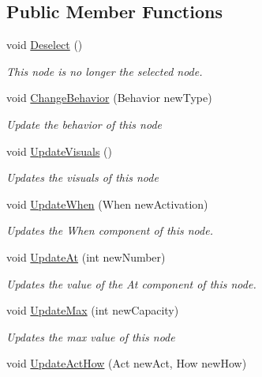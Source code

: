 \subsection*{Public Member Functions}
\begin{DoxyCompactItemize}
\item 
void \hyperlink{class_select_node_button_ac0062be5316502f6835aaa2334408bf0}{Deselect} ()
\begin{DoxyCompactList}\small\item\em This node is no longer the selected node. \end{DoxyCompactList}\item 
void \hyperlink{class_select_node_button_a23cb12320f235b9caf63e15c27c100ed}{Change\+Behavior} (Behavior new\+Type)
\begin{DoxyCompactList}\small\item\em Update the behavior of this node \end{DoxyCompactList}\item 
void \hyperlink{class_select_node_button_a0b21ceeb215b5732c7331efa2fb2f434}{Update\+Visuals} ()
\begin{DoxyCompactList}\small\item\em Updates the visuals of this node \end{DoxyCompactList}\item 
void \hyperlink{class_select_node_button_a5c76435d61c0b3bfdc9e6b9ba64f8bc2}{Update\+When} (When new\+Activation)
\begin{DoxyCompactList}\small\item\em Updates the When component of this node. \end{DoxyCompactList}\item 
void \hyperlink{class_select_node_button_af473e0efc29077bd547d6aa39ed5afc0}{Update\+At} (int new\+Number)
\begin{DoxyCompactList}\small\item\em Updates the value of the At component of this node. \end{DoxyCompactList}\item 
void \hyperlink{class_select_node_button_aff33f2066242975f61556b60e2ebcbb1}{Update\+Max} (int new\+Capacity)
\begin{DoxyCompactList}\small\item\em Updates the max value of this node \end{DoxyCompactList}\item 
void \hyperlink{class_select_node_button_a818b654206abd20d9cd47ddb2dd0beaf}{Update\+Act\+How} (Act new\+Act, How new\+How)

\end{DoxyCompactItemize}
